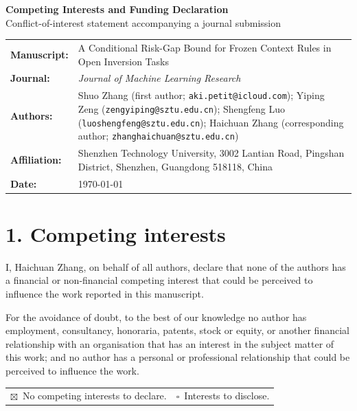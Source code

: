 \documentclass[10pt]{article}
\newcommand{\checkedbox}{\ensuremath{\boxtimes}}
\newcommand{\uncheckedbox}{\ensuremath{\square}}
\begin{document}
\begin{center}
  {\Large\bfseries Competing Interests and Funding Declaration}\\[3pt]
  {\small Conflict-of-interest statement accompanying a journal submission}
\end{center}

\vspace{0.4em}

\begin{tabular}{@{}p{}p{}@{}}
\textbf{Manuscript:} &
A Conditional Risk-Gap Bound for Frozen Context Rules
in Open Inversion Tasks \\[4pt]
\textbf{Journal:} & \emph{Journal of Machine Learning Research} \\[4pt]
\textbf{Authors:} & {\raggedright Shuo Zhang (first author;
\texttt{aki.petit@icloud.com}); Yiping Zeng
(\texttt{zengyiping@sztu.edu.cn}); Shengfeng Luo
(\texttt{luoshengfeng@sztu.edu.cn}); Haichuan Zhang (corresponding author;
\texttt{zhanghaichuan@sztu.edu.cn})\par} \\[4pt]
\textbf{Affiliation:} & Shenzhen Technology University, 3002 Lantian Road, Pingshan
District, Shenzhen, Guangdong 518118, China \\[4pt]
\textbf{Date:} & \today
\end{tabular}

\vspace{0.5em}

\section*{1. Competing interests}

I, Haichuan Zhang, on behalf of all authors, declare that none of the authors has a
financial or non-financial competing interest that could be perceived to influence the
work reported in this manuscript.

For the avoidance of doubt, to the best of our knowledge no author has employment,
consultancy, honoraria, patents, stock or equity, or another financial relationship
with an organisation that has an interest in the subject matter of this work; and no
author has a personal or professional relationship that could be perceived to influence
the work.

\begin{tabular}{@{}p{}p{}@{}}
\checkedbox\ No competing interests to declare. & \uncheckedbox\ Interests to disclose. \\
\end{tabular}
\end{document}
